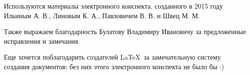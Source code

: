 \documentclass[../main.tex]{subfiles}
\begin{document}
{    \vspace{1.5em}
    
    Используются материалы электронного конспекта, созданного в 
    2015 году Ильиным А. В., Линовым К. А., Павловичем В. В. и 
    Швец М. М.

    \smallskip
    
    Также выражаем благодарность Булатову Владимиру Ивановичу за 
    предложенные исправления и замечания.
    
    \smallskip
    
    Еще хочется поблагодарить создателей \LaTeX\ за замечательную 
    систему создания документов: без них этого электронного 
    конспекта не было бы :)
}

\pagebreak
\end{document}
